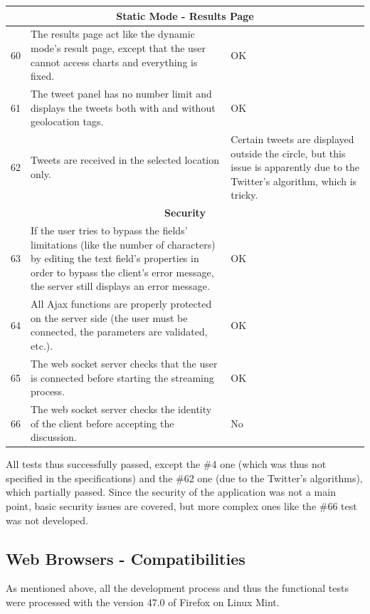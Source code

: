 \documentclass[a4paper,11pt]{report}
\begin{document}
\begin{center}
\begin{longtable}{|l|p{10cm}|p{4.4cm}|}
	\multicolumn{3}{|c|}{\textbf{Static Mode - Results Page}}\\\hline
	60 & The results page act like the dynamic mode's result page, except that the user cannot access charts and everything is fixed. & \color{ForestGreen}OK\color{black}\\\hline
	61 & The tweet panel has no number limit and displays the tweets both with and without geolocation tags. & \color{ForestGreen}OK\color{black}\\\hline
	62 & Tweets are received in the selected location only. & \color{Orange}Certain tweets are displayed outside the circle, but this issue is apparently due to the Twitter's algorithm, which is tricky.\color{black}\\\hline
	
	\multicolumn{3}{|c|}{\textbf{Security}}\\\hline
	63 & If the user tries to bypass the fields' limitations (like the number of characters) by editing the text field's properties in order to bypass the client's error message, the server still displays an error message. &	\color{ForestGreen}OK\color{black}\\\hline
	64 & All Ajax functions are properly protected on the server side (the user must be connected, the parameters are validated, etc.). & \color{ForestGreen}OK\color{black}\\\hline
	65 & The web socket server checks that the user is connected before starting the streaming process. &  \color{ForestGreen}OK\color{black}\\\hline
	66 & The web socket server checks the identity of the client before accepting the discussion. &  \color{red}No\color{black}\\\hline
	 
\end{longtable}
\end{center}
\vspace{-20pt}

All tests thus successfully passed, except the \#4 one (which was thus not specified in the specifications) and the \#62 one (due to the Twitter's algorithms), which partially passed. Since the security of the application was not a main point, basic security issues are covered, but more complex ones like the \#66 test was not developed.
\newpage

\subsection{Web Browsers - Compatibilities}
\label{webBrowsersCompatibilities}
As mentioned above, all the development process and thus the functional tests were processed with the version 47.0 of Firefox on Linux Mint.\\
\end{document}
